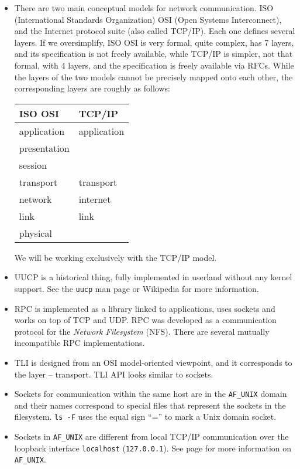 \begin{itemize}
\item There are two main conceptual models for network communication.  ISO
(International Standards Organization) OSI (Open Systems Interconnect), and the
Internet protocol suite (also called TCP/IP).   Each one defines several layers.
If we oversimplify, ISO OSI is very formal, quite complex, has 7 layers, and its
specification is not freely available, while TCP/IP is simpler, not that formal,
with 4 layers, and the specification is freely available via RFCs.  While the
layers of the two models cannot be precisely mapped onto each other, the
corresponding layers are roughly as follows:

\vspace{1.5mm}

\renewcommand{\arraystretch}{1.2}
\begin{tabular}{|l|l|}\hline
ISO OSI & TCP/IP\\
\hline
\hline
application & application\\
presentation & \\
session & \\
\hline
transport & transport\\
\hline
network & internet\\
\hline
link & link\\
physical & \\
\hline
\end{tabular}
\renewcommand{\arraystretch}{1}

\vspace{1.5mm}

We will be working exclusively with the TCP/IP model.

\item UUCP is a historical thing, fully implemented in userland without any
kernel support.  See the \texttt{uucp} man page or Wikipedia for more
information.
\item RPC is implemented as a library linked to applications, uses sockets
and works on top of TCP and UDP.  RPC was developed as a communication protocol
for the \emph{Network Filesystem} (NFS).  There are several mutually
incompatible RPC implementations.
\item TLI is designed from an OSI model-oriented viewpoint, and it corresponds
to the  layer -- transport.  TLI API looks similar to sockets.
\item Sockets for communication within the same host are in the
\texttt{AF\_UNIX} domain and their names correspond to special files that
represent the sockets in the filesystem.  \texttt{ls -F} uses the equal sign
``='' to mark a Unix domain socket.
\item Sockets in \texttt{AF\_UNIX} are different from local TCP/IP communication
over the loopback interface \texttt{localhost} (\texttt{127.0.0.1}).  See page
\pageref{SOCKET} for more information on \texttt{AF\_UNIX}.
\end{itemize}

